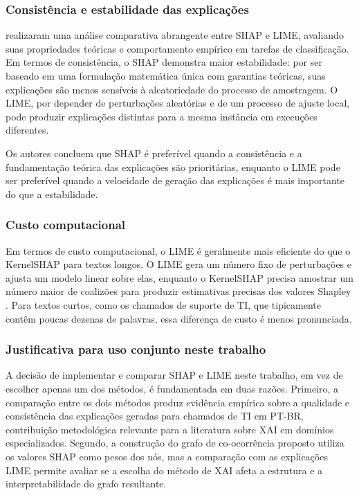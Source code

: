 \documentclass[
    12pt,                %
    openright,           %
    oneside,             %
    a4paper,             %
    english,             %
    brazil               %
]{abntex2}
\begin{document}
\subsubsection{Consistência e estabilidade das explicações}
\label{subsubsec:comparacao_consistencia}

 realizaram uma análise comparativa abrangente entre SHAP e LIME, avaliando suas propriedades teóricas e comportamento empírico em tarefas de classificação. Em termos de consistência, o SHAP demonstra maior estabilidade: por ser baseado em uma formulação matemática única com garantias teóricas, suas explicações são menos sensíveis à aleatoriedade do processo de amostragem. O LIME, por depender de perturbações aleatórias e de um processo de ajuste local, pode produzir explicações distintas para a mesma instância em execuções diferentes.

Os autores concluem que SHAP é preferível quando a consistência e a fundamentação teórica das explicações são prioritárias, enquanto o LIME pode ser preferível quando a velocidade de geração das explicações é mais importante do que a estabilidade.

\subsubsection{Custo computacional}
\label{subsubsec:comparacao_custo}

Em termos de custo computacional, o LIME é geralmente mais eficiente do que o KernelSHAP para textos longos. O LIME gera um número fixo de perturbações e ajusta um modelo linear sobre elas, enquanto o KernelSHAP precisa amostrar um número maior de coalizões para produzir estimativas precisas dos valores Shapley \cite{salih2023}. Para textos curtos, como os chamados de suporte de TI, que tipicamente contêm poucas dezenas de palavras, essa diferença de custo é menos pronunciada.

\subsubsection{Justificativa para uso conjunto neste trabalho}
\label{subsubsec:comparacao_justificativa}

A decisão de implementar e comparar SHAP e LIME neste trabalho, em vez de escolher apenas um dos métodos, é fundamentada em duas razões. Primeiro, a comparação entre os dois métodos produz evidência empírica sobre a qualidade e consistência das explicações geradas para chamados de TI em PT-BR, contribuição metodológica relevante para a literatura sobre XAI em domínios especializados. Segundo, a construção do grafo de co-ocorrência proposto utiliza os valores SHAP como pesos dos nós, mas a comparação com as explicações LIME permite avaliar se a escolha do método de XAI afeta a estrutura e a interpretabilidade do grafo resultante.
\end{document}
